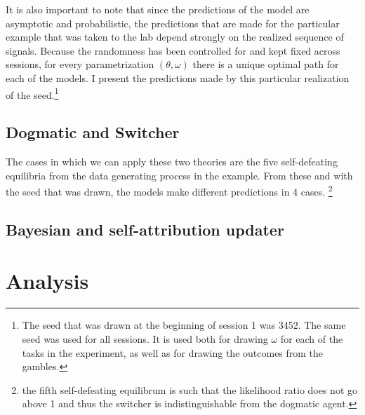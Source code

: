 \documentclass[
  12pt,
]{article}
\begin{document}
It is also important to note that since the predictions of the model are
asymptotic and probabilistic, the predictions that are made for the
particular example that was taken to the lab depend strongly on the
realized sequence of signals. Because the randomness has been controlled
for and kept fixed across sessions, for every parametrization
\((\theta, \omega)\) there is a unique optimal path for each of the
models. I present the predictions made by this particular realization of
the seed.\footnote{The seed that was drawn 
at the beginning of session 1 was 3452. The same seed was used for all sessions. It is used both for drawing $\omega$ for each of 
the tasks in the experiment, as well as for drawing the outcomes from the gambles.}

\hypertarget{dogmatic-and-switcher}{%
\subsection{Dogmatic and Switcher}\label{dogmatic-and-switcher}}

The cases in which we can apply these two theories are the five
self-defeating equilibria from the data generating process in the
example. From these and with the seed that was drawn, the models make
different predictions in 4 cases. \footnote{the fifth 
self-defeating equilibrum is such that the likelihood ratio does not go above 1 and thus the switcher is indistinguishable from 
the dogmatic agent.}

\hypertarget{bayesian-and-self-attribution-updater}{%
\subsection{Bayesian and self-attribution
updater}\label{bayesian-and-self-attribution-updater}}

\hypertarget{analysis}{%
\section{Analysis}\label{analysis}}

\renewcommand\refname{Conclusion}
  
\end{document}
